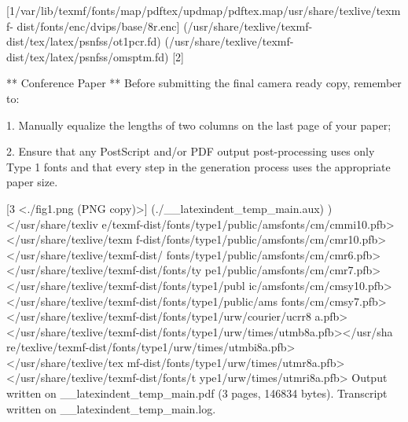 [1{/var/lib/texmf/fonts/map/pdftex/updmap/pdftex.map}{/usr/share/texlive/texmf-
dist/fonts/enc/dvips/base/8r.enc}]
(/usr/share/texlive/texmf-dist/tex/latex/psnfss/ot1pcr.fd)
(/usr/share/texlive/texmf-dist/tex/latex/psnfss/omsptm.fd)
[2]

** Conference Paper **
Before submitting the final camera ready copy, remember to:

 1. Manually equalize the lengths of two columns on the last page
 of your paper;

 2. Ensure that any PostScript and/or PDF output post-processing
 uses only Type 1 fonts and that every step in the generation
 process uses the appropriate paper size.


[3 <./fig1.png (PNG copy)>] (./__latexindent_temp_main.aux) )</usr/share/texliv
e/texmf-dist/fonts/type1/public/amsfonts/cm/cmmi10.pfb></usr/share/texlive/texm
f-dist/fonts/type1/public/amsfonts/cm/cmr10.pfb></usr/share/texlive/texmf-dist/
fonts/type1/public/amsfonts/cm/cmr6.pfb></usr/share/texlive/texmf-dist/fonts/ty
pe1/public/amsfonts/cm/cmr7.pfb></usr/share/texlive/texmf-dist/fonts/type1/publ
ic/amsfonts/cm/cmsy10.pfb></usr/share/texlive/texmf-dist/fonts/type1/public/ams
fonts/cm/cmsy7.pfb></usr/share/texlive/texmf-dist/fonts/type1/urw/courier/ucrr8
a.pfb></usr/share/texlive/texmf-dist/fonts/type1/urw/times/utmb8a.pfb></usr/sha
re/texlive/texmf-dist/fonts/type1/urw/times/utmbi8a.pfb></usr/share/texlive/tex
mf-dist/fonts/type1/urw/times/utmr8a.pfb></usr/share/texlive/texmf-dist/fonts/t
ype1/urw/times/utmri8a.pfb>
Output written on __latexindent_temp_main.pdf (3 pages, 146834 bytes).
Transcript written on __latexindent_temp_main.log.
